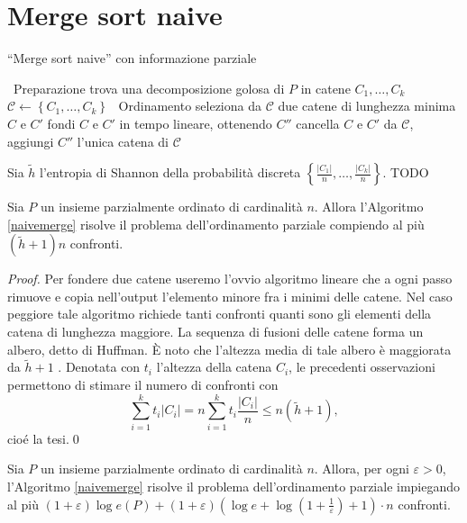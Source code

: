 \section{Merge sort naive} 
\begin{algorithm}
	\caption{``Merge sort naive'' con informazione parziale} \label{naivemerge} 
	\begin{algorithmic}
		[1] \STATE \, \COMMENT Preparazione \STATE trova una decomposizione golosa di \(P\) in catene \(C_1,\dots,C_k\) \STATE \(\mathcal{C}\leftarrow\left\{C_1,\dots,C_k\right\}\) \STATE \, \COMMENT Ordinamento  \STATE seleziona da \(\mathcal{C}\) due catene di lunghezza minima \(C\) e \(C'\) \STATE fondi \(C\) e \(C'\) in tempo lineare, ottenendo \(C''\) \STATE cancella \(C\) e \(C'\) da \(\mathcal{C}\), aggiungi \(C''\) \ENDWHILE \RETURN l'unica catena di \(\mathcal{C}\) 
	\end{algorithmic}
\end{algorithm}
Sia \(\tilde{h}\) l'entropia di Shannon della probabilità discreta \(\left\{\frac{|C_1|}{n},\dots,\frac{|C_k|}{n}\right\}\). TODO
\begin{lemma}
	\label{naivemergelemma} Sia \(P\) un insieme parzialmente ordinato di cardinalità \(n\). Allora l'Algoritmo \ref{naivemerge} risolve il problema dell'ordinamento parziale compiendo al più \((\tilde{h}+1)n\) confronti. 
\end{lemma}
\begin{proof}
	Per fondere due catene useremo l'ovvio algoritmo lineare che a ogni passo rimuove e copia nell'output l'elemento minore fra i minimi delle catene. Nel caso peggiore tale algoritmo richiede tanti confronti quanti sono gli elementi della catena di lunghezza maggiore. La sequenza di fusioni delle catene forma un albero, detto di Huffman. È noto che l'altezza media di tale albero è maggiorata da \(\tilde{h}+1\) \cite{Cover2006}. Denotata con \(t_i\) l'altezza della catena \(C_i\), le precedenti osservazioni permettono di stimare il numero di confronti con
	\[\sum_{i=1}^{k}{t_i|C_i|}=n\sum_{i=1}^{k}{t_i\frac{|C_i|}{n}}\le n(\tilde{h}+1),\]
	cioé la tesi.\qed 
\end{proof}
\begin{theorem}
	\label{naivemergetheorem} Sia \(P\) un insieme parzialmente ordinato di cardinalità \(n\). Allora, per ogni \(\varepsilon>0\), l'Algoritmo \ref{naivemerge} risolve il problema dell'ordinamento parziale impiegando al più \((1+\varepsilon)\log{e(P)}+(1+\varepsilon)\left(\log{e}+\log{\left(1+\frac{1}{\varepsilon}\right)}+1\right)\cdot n\) confronti. 
\end{theorem}
